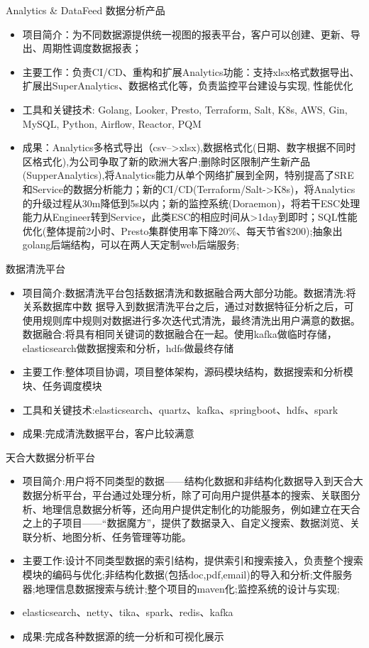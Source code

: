 \documentclass{resume}
\begin{document}
Analytics \& DataFeed 数据分析产品
\begin{itemize}
  \item 项目简介：为不同数据源提供统一视图的报表平台，客户可以创建、更新、导出、周期性调度数据报表；
  \item 主要工作：负责CI/CD、重构和扩展Analytics功能：支持xlsx格式数据导出、扩展出SuperAnalytics、数据格式化等，负责监控平台建设与实现, 性能优化
  \item 工具和关键技术: Golang, Looker, Presto, Terraform, Salt, K8s, AWS, Gin, MySQL, Python, Airflow, Reactor, PQM
  \item 成果：Analytics多格式导出（csv-->xlsx),数据格式化(日期、数字根据不同时区格式化),为公司争取了新的欧洲大客户;删除时区限制产生新产品(SupperAnalytics),将Analytics能力从单个网络扩展到全网，特别提高了SRE和Service的数据分析能力；新的CI/CD(Terraform/Salt->K8s)，将Analytics的升级过程从30m降低到5s以内；新的监控系统(Doraemon)，将若干ESC处理能力从Engineer转到Service，此类ESC的相应时间从>1day到即时；SQL性能优化(整体提前2小时、Presto集群使用率下降20\%、每天节省\$200);抽象出golang后端结构，可以在两人天定制web后端服务;
\end{itemize}

\begin{onehalfspacing}
数据清洗平台
\begin{itemize}
  \item 项目简介:数据清洗平台包括数据清洗和数据融合两大部分功能。数据清洗:将关系数据库中数 据导入到数据清洗平台之后，通过对数据特征分析之后，可使用规则库中规则对数据进行多次迭代式清洗，最终清洗出用户满意的数据。数据融合:将具有相同关键词的数据融合在一起。使用kafka做临时存储，elasticsearch做数据搜索和分析，hdfs做最终存储
  \item 主要工作:整体项目协调，项目整体架构，源码模块结构，数据搜索和分析模块、任务调度模块
  \item 工具和关键技术:elasticsearch、quartz、kafka、springboot、hdfs、spark
  \item 成果:完成清洗数据平台，客户比较满意
\end{itemize}
\end{onehalfspacing}
\begin{onehalfspacing}
天合大数据分析平台
\begin{itemize}
  \item 项目简介:用户将不同类型的数据——结构化数据和非结构化数据导入到天合大数据分析平台，平台通过处理分析，除了可向用户提供基本的搜索、关联图分析、地理信息数据分析等，还向用户提供定制化的功能服务，例如建立在天合之上的子项目——“数据魔方”，提供了数据录入、自定义搜索、数据浏览、关联分析、地图分析、任务管理等功能。
  \item 主要工作:设计不同类型数据的索引结构，提供索引和搜索接入，负责整个搜索模块的编码与优化;非结构化数据(包括doc,pdf,email)的导入和分析;文件服务器;地理信息数据搜索与统计;整个项目的maven化;监控系统的设计与实现;
  \item elasticsearch、netty、tika、spark、redis、kafka
  \item 成果:完成各种数据源的统一分析和可视化展示
\end{itemize}
\end{onehalfspacing}
\end{document}
